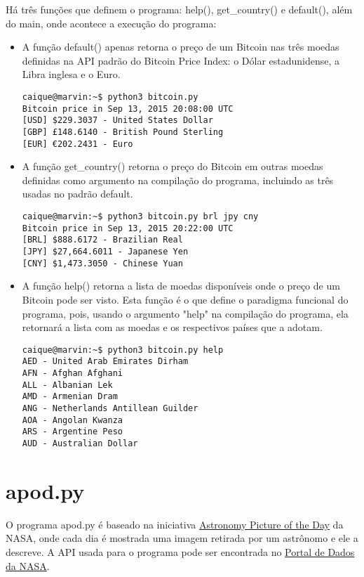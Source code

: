 \documentclass{article}
\begin{document}
Há três funções que definem o programa: help(), get\_country() e default(),
além do main, onde acontece a execução do programa:
\begin{itemize}
    \item A função default() apenas retorna o preço de um Bitcoin nas três
        moedas definidas na API padrão do Bitcoin Price Index: o Dólar
        estadunidense, a Libra inglesa e o Euro.
\begin{verbatim}caique@marvin:~$ python3 bitcoin.py 
Bitcoin price in Sep 13, 2015 20:08:00 UTC
[USD] $229.3037 - United States Dollar
[GBP] £148.6140 - British Pound Sterling
[EUR] €202.2431 - Euro
\end{verbatim}
    
    \item A função get\_country() retorna o preço do Bitcoin em outras moedas
        definidas como argumento na compilação do programa, incluindo as três
        usadas no padrão default.
\begin{verbatim}caique@marvin:~$ python3 bitcoin.py brl jpy cny
Bitcoin price in Sep 13, 2015 20:22:00 UTC
[BRL] $888.6172 - Brazilian Real
[JPY] $27,664.6011 - Japanese Yen
[CNY] $1,473.3050 - Chinese Yuan
    \end{verbatim}
    
    \item A função help() retorna a lista de moedas disponíveis onde o preço de
        um Bitcoin pode ser visto. Esta função é o que define o paradigma
        funcional do programa, pois, usando o argumento "help" na compilação do
        programa, ela retornará a lista com as moedas e os respectivos países
        que a adotam.
\begin{verbatim}caique@marvin:~$ python3 bitcoin.py help
AED - United Arab Emirates Dirham
AFN - Afghan Afghani
ALL - Albanian Lek
AMD - Armenian Dram
ANG - Netherlands Antillean Guilder
AOA - Angolan Kwanza
ARS - Argentine Peso
AUD - Australian Dollar    
\end{verbatim}
\end{itemize}

\newpage
\section*{apod.py}
O programa apod.py é baseado na iniciativa
\href{http://apod.nasa.gov/apod/astropix.html}{Astronomy Picture of the Day} da
NASA, onde cada dia é mostrada uma imagem retirada por um astrônomo e ele a
descreve. A API usada para o programa pode ser encontrada no
\href{https://data.nasa.gov/developer}{Portal de Dados da NASA}.
\end{document}
